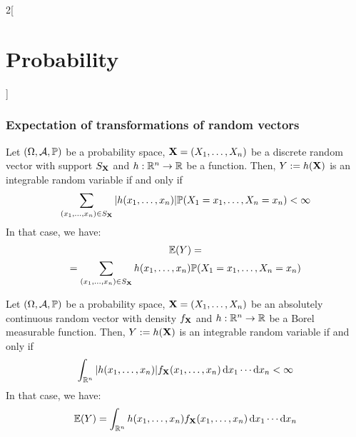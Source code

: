 \documentclass[../../../main_math.tex]{subfiles}
\begin{document}
\begin{multicols}{2}[\section{Probability}]
  \subsubsection{Expectation of transformations of random vectors}
  \begin{proposition}
    Let $(\Omega,\mathcal{A},\mathbb{P})$ be a probability space, $\boldsymbol{\mathrm{X}}=(X_1,\ldots,X_n)$ be a discrete random vector with support $S_{\boldsymbol{\mathrm{X}}}$ and $h:\mathbb{R}^n\rightarrow\mathbb{R}$ be a function. Then, $Y:=h(\boldsymbol{\mathrm{X}})$ is an integrable random variable if and only if $$\sum_{(x_1,\ldots,x_n)\in S_{\boldsymbol{\mathrm{X}}}}|h(x_1,\ldots,x_n)|\mathbb{P}(X_1=x_1,\ldots,X_n=x_n)<\infty$$
    In that case, we have:
    \begin{multline*}
      \mathbb{E}(Y)=\\=\sum_{(x_1,\ldots,x_n)\in S_{\boldsymbol{\mathrm{X}}}}h(x_1,\ldots,x_n)\mathbb{P}(X_1=x_1,\ldots,X_n=x_n)
    \end{multline*}
  \end{proposition}
  \begin{proposition}
    Let $(\Omega,\mathcal{A},\mathbb{P})$ be a probability space, $\boldsymbol{\mathrm{X}}=(X_1,\ldots,X_n)$ be an absolutely continuous random vector with density $f_{\boldsymbol{\mathrm{X}}}$ and $h:\mathbb{R}^n\rightarrow\mathbb{R}$ be a Borel measurable function. Then, $Y:=h(\boldsymbol{\mathrm{X}})$ is an integrable random variable if and only if $$\int_{\mathbb{R}^n}|h(x_1,\ldots,x_n)|f_{\boldsymbol{\mathrm{X}}}(x_1,\ldots,x_n)\dd{x_1}\cdots\dd{x_n}<\infty$$
    In that case, we have:
    $$
      \mathbb{E}(Y)=\int_{\mathbb{R}^n}h(x_1,\ldots,x_n)f_{\boldsymbol{\mathrm{X}}}(x_1,\ldots,x_n)\dd{x_1}\cdots\dd{x_n}$$
  \end{proposition}

\end{multicols}
\end{document}
